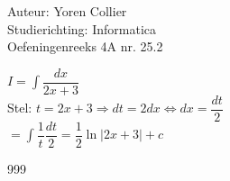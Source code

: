 \documentclass[a4paper]{article}
\newcommand{\asa}{\Leftrightarrow} %
\newcommand{\adR}{\Rightarrow} %
\newcommand{\intgrl}{\displaystyle\int} %
\begin{document}
\noindent \large Auteur: Yoren Collier \\
\noindent \large Studierichting: Informatica\\
\noindent \large Oefeningenreeks 4A nr. 25.2\\

\medskip

\normalsize

$ I =  \intgrl \dfrac{dx}{2x +3} $\\

Stel: $t = 2x +3 \adR dt = 2dx \asa dx = \dfrac{dt}{2}$\\

$= \intgrl\dfrac{1}{t} \dfrac{dt}{2} = \dfrac{1}{2} \ln |2x +3| +c$

\begin{thebibliography}{999}
\end{thebibliography}
\end{document}
